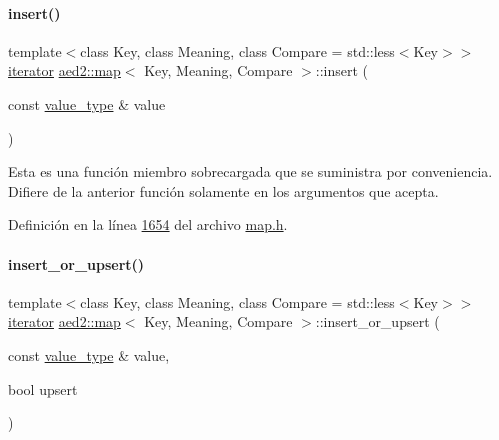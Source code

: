 \paragraph{\texorpdfstring{insert()}{insert()}\hspace{0.1cm}{\footnotesize\ttfamily [2/2]}}
{\footnotesize\ttfamily template$<$class Key, class Meaning, class Compare = std\+::less$<$\+Key$>$$>$ \\
\hyperlink{classaed2_1_1map_1_1iterator}{iterator} \hyperlink{classaed2_1_1map}{aed2\+::map}$<$ Key, Meaning, Compare $>$\+::insert (\begin{DoxyParamCaption}\item[{const \hyperlink{classaed2_1_1map_a719db98e0ff9a837610f76be33264680_a719db98e0ff9a837610f76be33264680}{value\+\_\+type} \&}]{value }\end{DoxyParamCaption})\hspace{0.3cm}{\ttfamily [inline]}}

Esta es una función miembro sobrecargada que se suministra por conveniencia. Difiere de la anterior función solamente en los argumentos que acepta. 

Definición en la línea \hyperlink{map_8h_source_l01654}{1654} del archivo \hyperlink{map_8h_source}{map.\+h}.

\mbox{\label{classaed2_1_1map_aef47582a93a069c4ec95da8c595e4fee_aef47582a93a069c4ec95da8c595e4fee}} 
\paragraph{\texorpdfstring{insert\+\_\+or\+\_\+upsert()}{insert\_or\_upsert()}}
{\footnotesize\ttfamily template$<$class Key, class Meaning, class Compare = std\+::less$<$\+Key$>$$>$ \\
\hyperlink{classaed2_1_1map_1_1iterator}{iterator} \hyperlink{classaed2_1_1map}{aed2\+::map}$<$ Key, Meaning, Compare $>$\+::insert\+\_\+or\+\_\+upsert (\begin{DoxyParamCaption}\item[{const \hyperlink{classaed2_1_1map_a719db98e0ff9a837610f76be33264680_a719db98e0ff9a837610f76be33264680}{value\+\_\+type} \&}]{value,  }\item[{bool}]{upsert }\end{DoxyParamCaption})\hspace{0.3cm}{\ttfamily [inline]}}




